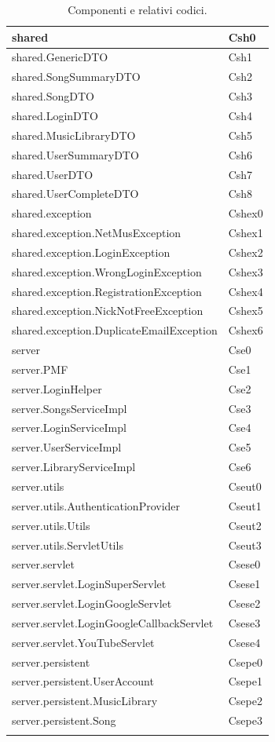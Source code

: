 \begin{footnotesize}
\begin{longtable}[!h]{|l|l|}
shared & Csh0\\\hline
shared.GenericDTO & Csh1\\\hline
shared.SongSummaryDTO & Csh2\\\hline
shared.SongDTO & Csh3\\\hline
shared.LoginDTO & Csh4\\\hline
shared.MusicLibraryDTO & Csh5\\\hline
shared.UserSummaryDTO & Csh6\\\hline
shared.UserDTO & Csh7\\\hline
shared.UserCompleteDTO & Csh8\\\hline
shared.exception & Cshex0\\\hline
shared.exception.NetMusException & Cshex1\\\hline
shared.exception.LoginException & Cshex2\\\hline
shared.exception.WrongLoginException & Cshex3\\\hline
shared.exception.RegistrationException & Cshex4\\\hline
shared.exception.NickNotFreeException & Cshex5\\\hline
shared.exception.DuplicateEmailException & Cshex6\\\hline
server & Cse0\\\hline
server.PMF & Cse1\\\hline
server.LoginHelper & Cse2\\\hline
server.SongsServiceImpl & Cse3\\\hline
server.LoginServiceImpl & Cse4\\\hline
server.UserServiceImpl & Cse5\\\hline
server.LibraryServiceImpl & Cse6\\\hline
server.utils & Cseut0\\\hline
server.utils.AuthenticationProvider & Cseut1\\\hline
server.utils.Utils & Cseut2\\\hline
server.utils.ServletUtils & Cseut3\\\hline
server.servlet & Csese0\\\hline
server.servlet.LoginSuperServlet & Csese1\\\hline
server.servlet.LoginGoogleServlet & Csese2\\\hline
server.servlet.LoginGoogleCallbackServlet & Csese3\\\hline
server.servlet.YouTubeServlet & Csese4\\\hline
server.persistent & Csepe0\\\hline
server.persistent.UserAccount & Csepe1\\\hline
server.persistent.MusicLibrary & Csepe2\\\hline
server.persistent.Song & Csepe3\\\hline
\caption{Componenti e relativi codici.}
\end{longtable}
\end{footnotesize}

